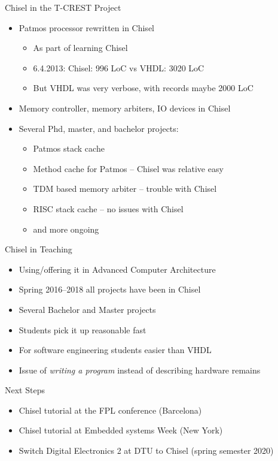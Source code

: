 \documentclass[xcolor=pdflatex,dvipsnames,table]{beamer}
\begin{document}
\begin{frame}[fragile]{Chisel in the T-CREST Project}
\begin{itemize}
\item Patmos processor rewritten in Chisel
\begin{itemize}
\item As part of learning Chisel
\item 6.4.2013: Chisel: 996 LoC vs VHDL: 3020 LoC
\item But VHDL was very verbose, with records maybe 2000 LoC
\end{itemize}
\item Memory controller, memory arbiters, IO devices in Chisel
\item Several Phd, master, and bachelor projects:
\begin{itemize}
\item Patmos stack cache
\item Method cache for Patmos -- Chisel was relative easy
\item TDM based memory arbiter -- trouble with Chisel
\item RISC stack cache -- no issues with Chisel
\item and more ongoing 
\end{itemize}
\end{itemize}
\end{frame}

\begin{frame}[fragile]{Chisel in Teaching}
\begin{itemize}
\item Using/offering it in Advanced Computer Architecture
\item Spring 2016--2018 all projects have been in Chisel
\item Several Bachelor and Master projects
\item Students pick it up reasonable fast
\item For software engineering students easier than VHDL
\item Issue of \emph{writing a program} instead of describing hardware remains
\end{itemize}
\end{frame}

\begin{frame}[fragile]{Next Steps}
\begin{itemize}
\item Chisel tutorial at the FPL conference (Barcelona)
\item Chisel tutorial at Embedded systems Week (New York)
\item Switch Digital Electronics 2 at DTU to Chisel (spring semester 2020)
\end{itemize}
\end{frame}
\end{document}
